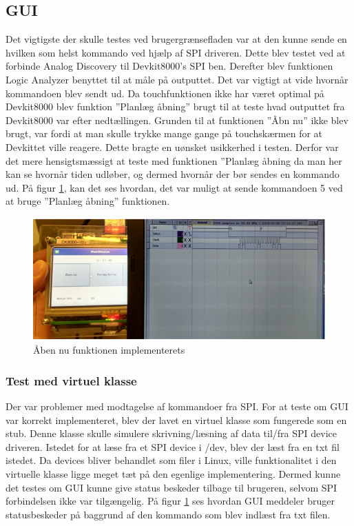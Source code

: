\subsection{GUI}
Det vigtigste der skulle testes ved brugergrænsefladen var at den kunne sende en hvilken som helst kommando ved hjælp af SPI driveren. Dette blev testet ved at 
forbinde Analog Discovery til Devkit8000’s SPI ben. Derefter blev funktionen Logic Analyzer benyttet til at måle på outputtet. Det var vigtigt at vide hvornår 
kommandoen blev sendt ud. Da touchfunktionen ikke har været optimal på Devkit8000 blev funktion ”Planlæg åbning” brugt til at teste hvad outputtet fra Devkit8000
 var efter nedtællingen. Grunden til at funktionen ”Åbn nu” ikke blev brugt, var fordi at man skulle trykke mange gange på touchskærmen for at Devkittet ville 
 reagere. Dette bragte en uønsket usikkerhed i testen. Derfor var det mere hensigtsmæssigt at teste med funktionen ”Planlæg åbning da man her kan se hvornår 
 tiden udløber, og dermed hvornår der bør sendes en kommando ud. På figur \ref{PAA}, kan det ses hvordan, det var muligt at sende kommandoen 5 ved at bruge 
 ”Planlæg åbning” funktionen. 

\begin{figure}[H]
	\includegraphics[scale=1]{tex/Test/GUI-Test/Billeder/test_GUI}
	\caption{Åben nu funktionen implementerets}
	\label{PAA}
\end{figure}

\subsubsection{Test med virtuel klasse}
Der var problemer med modtagelse af kommandoer fra SPI. For at teste om GUI var korrekt implementeret, blev der lavet en virtuel klasse som fungerede som en 
stub. Denne klasse skulle simulere skrivning/læsning af data til/fra SPI device driveren. Istedet for at læse fra et SPI device i /dev, blev der læst fra en txt 
fil istedet. Da devices bliver behandlet som filer i Linux, ville funktionalitet i den virtuelle klasse ligge meget tæt på den egenlige implementering. Dermed 
kunne det testes om GUI kunne give status beskeder tilbage til brugeren, selvom SPI forbindelsen ikke var tilgængelig. På figur \ref{PAA} ses hvordan GUI meddeler 
bruger statusbeskeder på baggrund af den kommando som blev indlæst fra txt filen.

